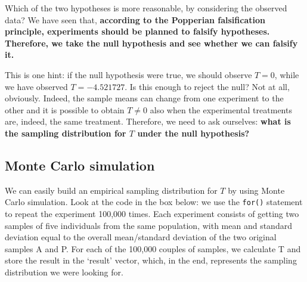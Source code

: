 \documentclass[a4paper,12pt,oneside]{book}
\begin{document}
Which of the two hypotheses is more reasonable, by considering the observed data? We have seen that, \textbf{according to the Popperian falsification principle, experiments should be planned to falsify hypotheses. Therefore, we take the null hypothesis and see whether we can falsify it.}

This is one hint: if the null hypothesis were true, we should observe \(T = 0\), while we have observed \(T = -4.521727\). Is this enough to reject the null? Not at all, obviously. Indeed, the sample means can change from one experiment to the other and it is possible to obtain \(T \neq 0\) also when the experimental treatments are, indeed, the same treatment. Therefore, we need to ask ourselves: \textbf{what is the sampling distribution for \(T\) under the null hypothesis?}

\hypertarget{monte-carlo-simulation}{%
\subsection{Monte Carlo simulation}\label{monte-carlo-simulation}}

We can easily build an empirical sampling distribution for \(T\) by using Monte Carlo simulation. Look at the code in the box below: we use the \texttt{for()} statement to repeat the experiment 100,000 times. Each experiment consists of getting two samples of five individuals from the same population, with mean and standard deviation equal to the overall mean/standard deviation of the two original samples A and P. For each of the 100,000 couples of samples, we calculate T and store the result in the `result' vector, which, in the end, represents the sampling distribution we were looking for.
\end{document}
